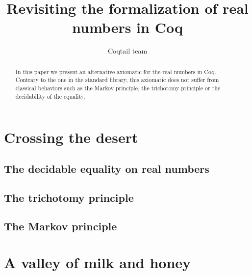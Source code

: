 \documentclass[a4paper,10pt]{article}
\title{Revisiting the formalization of real numbers in Coq}
\author{Coqtail team}
\begin{document}
\maketitle

\begin{abstract}
	In this paper we present an alternative axiomatic for the real 
	numbers in Coq. Contrary to the one in the standard library, this 
	axiomatic does not suffer from classical behaviors such as the 
	Markov principle, the trichotomy principle or the decidability of
	the equality.
\end{abstract}

\section{Crossing the desert}

\subsection{The decidable equality on real numbers}

\subsection{The trichotomy principle}

\subsection{The Markov principle}

\section{A valley of milk and honey}
\end{document}
